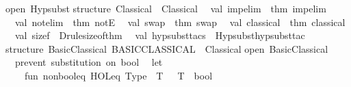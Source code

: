 \begin{isabellebody}
{\isacharparenright}{\kern0pt}{\isacharsemicolon}{\kern0pt}\isanewline
open\ Hypsubst{\isacharsemicolon}{\kern0pt}\isanewline
\isanewline
structure\ Classical\ {\isacharequal}{\kern0pt}\ Classical\isanewline
{\isacharparenleft}{\kern0pt}\isanewline
\ \ val\ imp{\isacharunderscore}{\kern0pt}elim\ {\isacharequal}{\kern0pt}\ {\isacharat}{\kern0pt}{\isacharbraceleft}{\kern0pt}thm\ imp{\isacharunderscore}{\kern0pt}elim{\isacharbraceright}{\kern0pt}\isanewline
\ \ val\ not{\isacharunderscore}{\kern0pt}elim\ {\isacharequal}{\kern0pt}\ {\isacharat}{\kern0pt}{\isacharbraceleft}{\kern0pt}thm\ notE{\isacharbraceright}{\kern0pt}\isanewline
\ \ val\ swap\ {\isacharequal}{\kern0pt}\ {\isacharat}{\kern0pt}{\isacharbraceleft}{\kern0pt}thm\ swap{\isacharbraceright}{\kern0pt}\isanewline
\ \ val\ classical\ {\isacharequal}{\kern0pt}\ {\isacharat}{\kern0pt}{\isacharbraceleft}{\kern0pt}thm\ classical{\isacharbraceright}{\kern0pt}\isanewline
\ \ val\ sizef\ {\isacharequal}{\kern0pt}\ Drule{\isachardot}{\kern0pt}size{\isacharunderscore}{\kern0pt}of{\isacharunderscore}{\kern0pt}thm\isanewline
\ \ val\ hyp{\isacharunderscore}{\kern0pt}subst{\isacharunderscore}{\kern0pt}tacs\ {\isacharequal}{\kern0pt}\ {\isacharbrackleft}{\kern0pt}Hypsubst{\isachardot}{\kern0pt}hyp{\isacharunderscore}{\kern0pt}subst{\isacharunderscore}{\kern0pt}tac{\isacharbrackright}{\kern0pt}\isanewline
{\isacharparenright}{\kern0pt}{\isacharsemicolon}{\kern0pt}\isanewline
\isanewline
structure\ Basic{\isacharunderscore}{\kern0pt}Classical{\isacharcolon}{\kern0pt}\ BASIC{\isacharunderscore}{\kern0pt}CLASSICAL\ {\isacharequal}{\kern0pt}\ Classical{\isacharsemicolon}{\kern0pt}\isanewline
open\ Basic{\isacharunderscore}{\kern0pt}Classical{\isacharsemicolon}{\kern0pt}\isanewline
{\isacartoucheclose}\isanewline
\isanewline
{}\isamarkupfalse%
\ {\isacartoucheopen}\isanewline
\ \ {\isacharparenleft}{\kern0pt}{\isacharasterisk}{\kern0pt}prevent\ substitution\ on\ bool{\isacharasterisk}{\kern0pt}{\isacharparenright}{\kern0pt}\isanewline
\ \ let\isanewline
\ \ \ \ fun\ non{\isacharunderscore}{\kern0pt}bool{\isacharunderscore}{\kern0pt}eq\ {\isacharparenleft}{\kern0pt}\isactrlconstUNDERSCOREname {\isasymopen}HOL{\isachardot}{\kern0pt}eq{\isasymclose}{\isacharcomma}{\kern0pt}\ Type\ {\isacharparenleft}{\kern0pt}{\isacharunderscore}{\kern0pt}{\isacharcomma}{\kern0pt}\ {\isacharbrackleft}{\kern0pt}T{\isacharcomma}{\kern0pt}\ {\isacharunderscore}{\kern0pt}{\isacharbrackright}{\kern0pt}{\isacharparenright}{\kern0pt}{\isacharparenright}{\kern0pt}\ {\isacharequal}{\kern0pt}\ T\ {\isacharless}{\kern0pt}{\isachargreater}{\kern0pt}\ \isactrltyp {\isasymopen}bool{\isasymclose}\isanewline

\end{isabellebody}
